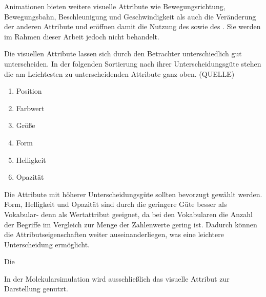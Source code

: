 Animationen bieten weitere visuelle Attribute wie Bewegungsrichtung, Bewegungsbahn, Beschleunigung und Geschwindigkeit als auch die Veränderung der anderen Attribute und eröffnen damit die Nutzung des  sowie des . Sie werden im Rahmen dieser Arbeit jedoch nicht behandelt.

Die visuellen Attribute lassen sich durch den Betrachter unterschiedlich gut unterscheiden. In der folgenden Sortierung nach ihrer Unterscheidungsgüte stehen die am Leichtesten zu unterscheidenden Attribute ganz oben. (QUELLE)
\begin{enumerate}
	\item Position
	\item Farbwert
	\item Größe
	\item Form
	\item Helligkeit
	\item Opazität
\end{enumerate}

Die Attribute mit höherer Unterscheidungsgüte sollten bevorzugt gewählt werden. Form, Helligkeit und Opazität sind durch die geringere Güte besser als Vokabular- denn als Wertattribut geeignet, da bei den Vokabularen die Anzahl der Begriffe im Vergleich zur Menge der Zahlenwerte gering ist. Dadurch können die Attributseigenschaften weiter auseinanderliegen, was eine leichtere Unterscheidung ermöglicht.

Die 

In der  Molekularsimulation wird ausschließlich das visuelle Attribut  zur Darstellung genutzt.

